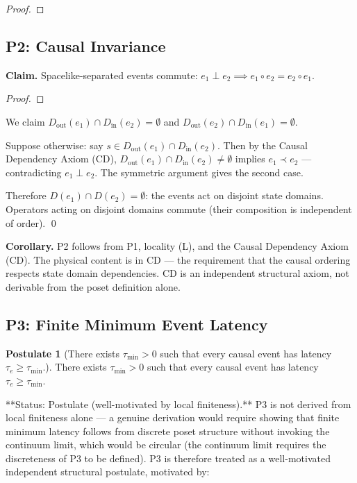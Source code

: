 \documentclass[11pt]{article}
\theoremstyle{definition}
\newtheorem{assumption}[theorem]{Postulate}
\theoremstyle{remark}
\begin{document}
\begin{proof}
\end{proof}

\subsection{P2: Causal Invariance}\label{p2-causal-invariance}

\textbf{Claim.} Spacelike-separated events commute:
\(e_1 \perp e_2 \implies e_1 \circ e_2 = e_2 \circ e_1\).

\begin{proof}
\end{proof}

We claim \(D_{\text{out}}(e_1) \cap D_{\text{in}}(e_2) = \emptyset\) and
\(D_{\text{out}}(e_2) \cap D_{\text{in}}(e_1) = \emptyset\).

Suppose otherwise: say
\(s \in D_{\text{out}}(e_1) \cap D_{\text{in}}(e_2)\). Then by the
Causal Dependency Axiom (CD),
\(D_{\text{out}}(e_1) \cap D_{\text{in}}(e_2) \neq \emptyset\) implies
\(e_1 \prec e_2\) --- contradicting \(e_1 \perp e_2\). The symmetric
argument gives the second case.

Therefore \(D(e_1) \cap D(e_2) = \emptyset\): the events act on disjoint
state domains. Operators acting on disjoint domains commute (their
composition is independent of order). \qed

\textbf{Corollary.} P2 follows from P1, locality (L), and the Causal
Dependency Axiom (CD). The physical content is in CD --- the requirement
that the causal ordering respects state domain dependencies. CD is an
independent structural axiom, not derivable from the poset definition
alone.

\subsection{P3: Finite Minimum Event
Latency}\label{p3-finite-minimum-event-latency}

\begin{assumption}[There exists $\tau_{\min} > 0$ such that every causal event has latency $\tau_e \geq \tau_{\min}$.]
There exists $\tau_{\min} > 0$ such that every causal event has latency $\tau_e \geq \tau_{\min}$.

**Status: Postulate (well-motivated by local finiteness).** P3 is not derived from local finiteness alone — a genuine derivation would require showing that finite minimum latency follows from discrete poset structure without invoking the continuum limit, which would be circular (the continuum limit requires the discreteness of P3 to be defined). P3 is therefore treated as a well-motivated independent structural postulate, motivated by:
\end{assumption}
\end{document}
